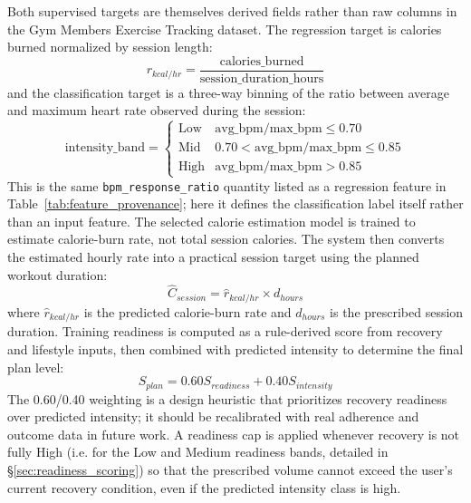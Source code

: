 \documentclass{aitthesis}
\begin{document}
Both supervised targets are themselves derived fields rather than raw columns in the Gym Members Exercise Tracking dataset. The regression target is calories burned normalized by session length:
\begin{equation}
r_{kcal/hr}=\frac{\text{calories\_burned}}{\text{session\_duration\_hours}}
\end{equation}
and the classification target is a three-way binning of the ratio between average and maximum heart rate observed during the session:
\begin{equation}
\text{intensity\_band}=
\begin{cases}
\text{Low} & \text{avg\_bpm}/\text{max\_bpm}\leq0.70\\
\text{Mid} & 0.70<\text{avg\_bpm}/\text{max\_bpm}\leq0.85\\
\text{High} & \text{avg\_bpm}/\text{max\_bpm}>0.85
\end{cases}
\end{equation}
This is the same \texttt{bpm\_response\_ratio} quantity listed as a regression feature in Table~\ref{tab:feature_provenance}; here it defines the classification label itself rather than an input feature. The selected calorie estimation model is trained to estimate calorie-burn rate, not total session calories. The system then converts the estimated hourly rate into a practical session target using the planned workout duration:
\begin{equation}
\widehat{C}_{session}=\widehat{r}_{kcal/hr}\times d_{hours}
\end{equation}
where $\widehat{r}_{kcal/hr}$ is the predicted calorie-burn rate and $d_{hours}$ is the prescribed session duration. Training readiness is computed as a rule-derived score from recovery and lifestyle inputs, then combined with predicted intensity to determine the final plan level:
\begin{equation}
S_{plan}=0.60S_{readiness}+0.40S_{intensity}
\end{equation}
The 0.60/0.40 weighting is a design heuristic that prioritizes recovery readiness over predicted intensity; it should be recalibrated with real adherence and outcome data in future work. A readiness cap is applied whenever recovery is not fully High (i.e. for the Low and Medium readiness bands, detailed in \S\ref{sec:readiness_scoring}) so that the prescribed volume cannot exceed the user's current recovery condition, even if the predicted intensity class is high.
\end{document}
